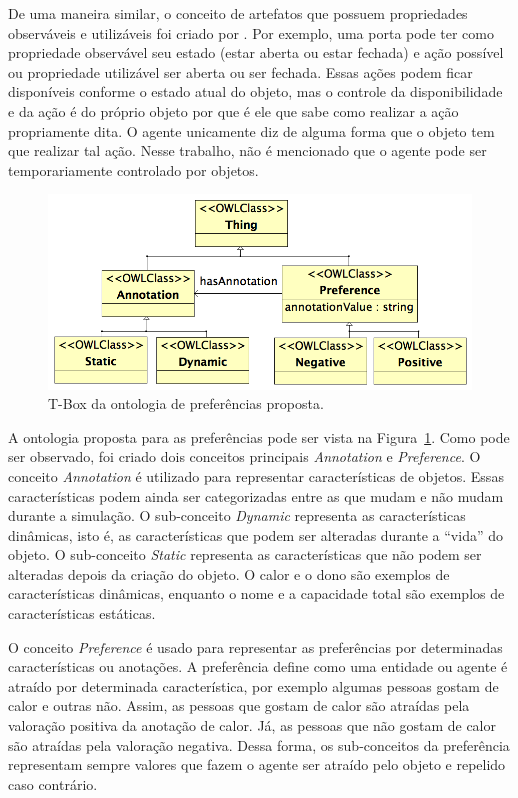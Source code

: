 De uma maneira similar, o conceito de artefatos que possuem propriedades
observáveis e utilizáveis foi criado por \citet{ricci31cartago}. Por exemplo,
uma porta pode ter como propriedade observável seu estado (estar aberta ou
estar fechada) e ação possível ou propriedade utilizável ser aberta ou ser
fechada. Essas ações podem ficar disponíveis conforme o estado atual do
objeto, mas o controle da disponibilidade e da ação é do próprio objeto por
que é ele que sabe como realizar a ação propriamente dita. O agente unicamente
diz de alguma forma que o objeto tem que realizar tal ação. Nesse trabalho,
não é mencionado que o agente pode ser temporariamente controlado por
objetos.

\begin{figure}
  \centering
    \includegraphics[width=130mm]{figuras/preferences.png}
  \caption{T-Box da ontologia de preferências proposta.}
  \label{fig:preferences}
\end{figure}

A ontologia proposta para as preferências pode ser vista na
Figura~\ref{fig:preferences}. Como pode ser observado, foi criado dois
conceitos principais \emph{Annotation} e \emph{Preference}. O conceito
\emph{Annotation} é utilizado para representar características de objetos.
Essas características podem ainda ser categorizadas entre as que mudam
e não mudam durante a simulação. O sub-conceito \emph{Dynamic} representa as
características dinâmicas, isto é, as características que podem ser alteradas
durante a ``vida'' do objeto. O sub-conceito \emph{Static} representa as
características que não podem ser alteradas depois da criação do objeto. O
calor e o dono são exemplos de características dinâmicas, enquanto o nome e a
capacidade total são exemplos de características estáticas.

O conceito \emph{Preference} é usado para representar as preferências por
determinadas características ou anotações. A preferência define como uma entidade ou
agente é atraído por determinada característica, por exemplo algumas pessoas
gostam de calor e outras não. Assim, as pessoas que gostam de calor são
atraídas pela valoração positiva da anotação de calor. Já, as pessoas que não
gostam de calor são atraídas pela valoração negativa. Dessa forma, os
sub-conceitos da preferência representam sempre valores que fazem o agente ser
atraído pelo objeto e repelido caso contrário.


